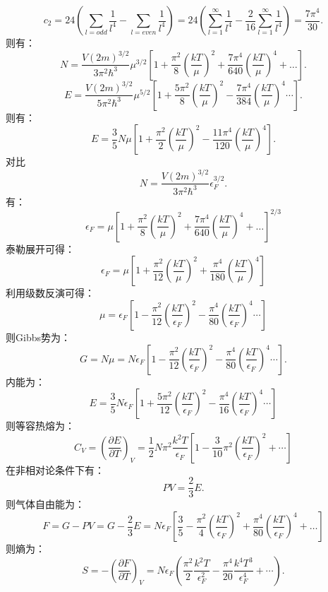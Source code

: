 \documentclass[reqno,a4paper,12pt]{amsart}
\begin{document}
\begin{tcolorbox}[breakable, colback = black!5!white, colframe = black]
\[\]
\[
	c_2 = 24 \left( \sum_{l=odd}\frac{1}{l^4} - \sum_{l=even} \frac{1}{l^4} \right) = 24 \left( \sum_{l=1}^{\infty} \frac{1}{l^4} - \frac{2}{16}\sum_{l=1}^{\infty} \frac{1}{l^4} \right) = \frac{7\pi^4}{30}.
\]
则有：
\[
	N = \frac{V(2m)^{3/2}}{3\pi^2\hbar^3} \mu^{3/2} \left[ 1 + \frac{\pi^2}{8}\left( \frac{kT}{\mu} \right)^2 + \frac{7\pi^4}{640} \left( \frac{kT}{\mu} \right)^4 + \dots \right].
\]
\[
	E = \frac{V(2m)^{3/2}}{5\pi^2\hbar^3}\mu^{5/2}\left[ 1 + \frac{5\pi^2}{8}\left( \frac{kT}{\mu} \right)^2 - \frac{7\pi^4}{384}\left( \frac{kT}{\mu} \right)^4 \cdots \right].
\]
则有：
\[
	E = \frac{3}{5}N\mu \left[ 1 + \frac{\pi^2}{2}\left( \frac{kT}{\mu} \right)^2 - \frac{11\pi^4}{120}\left( \frac{kT}{\mu} \right)^4 \right].
\]
对比
\[
	N = \frac{V(2m)^{3/2}}{3\pi^2\hbar^3}\epsilon_F^{3/2}.
\]
有：
\[
	\epsilon_F = \mu \left[ 1 + \frac{\pi^2}{8}\left( \frac{kT}{\mu} \right)^2 + \frac{7\pi^4}{640} \left( \frac{kT}{\mu} \right)^4 + \dots \right]^{2/3}
\]
泰勒展开可得：
\[
	\epsilon_F = \mu\left[ 1 + \frac{\pi^2}{12}\left( \frac{kT}{\mu} \right)^2 + \frac{\pi^4}{180}\left( \frac{kT}{\mu} \right)^4 \right]
\]
利用级数反演可得：
\[
	\mu = \epsilon_F \left[ 1 - \frac{\pi^2}{12}\left( \frac{kT}{\epsilon_F} \right)^2 - \frac{\pi^4}{80}\left( \frac{kT}{\epsilon_F} \right)^4 \cdots \right]
\]
则Gibbs势为：
\[
	G = N\mu = N\epsilon_F \left[ 1 - \frac{\pi^2}{12}\left( \frac{kT}{\epsilon_F} \right)^2 - \frac{\pi^4}{80}\left( \frac{kT}{\epsilon_F} \right)^4 \cdots  \right].
\]
内能为：
\[
	E = \frac{3}{5}N\epsilon_F \left[ 1 + \frac{5\pi^2}{12}\left( \frac{kT}{\epsilon_F} \right)^2 - \frac{\pi^4}{16}\left( \frac{kT}{\epsilon_F} \right)^4 \cdots \right]
\]
则等容热熔为：
\[
	C_V = \left( \frac{\partial E}{\partial T} \right)_V = \frac{1}{2}N\pi^2\frac{k^2T}{\epsilon_F} \left[ 1 - \frac{3}{10}\pi^2\left( \frac{kT}{\epsilon_F} \right)^2 + \cdots \right]
\]
在非相对论条件下有：
\[
	PV = \frac{2}{3}E.
\]
则气体自由能为：
\[
	F = G - PV = G - \frac{2}{3}E = N\epsilon_F\left[ \frac{3}{5} - \frac{\pi^2}{4}\left( \frac{kT}{\epsilon_F} \right)^2 + \frac{\pi^4}{80}\left( \frac{kT}{\epsilon_F} \right)^4 + \dots \right]
\]
则熵为：
\[
	S = -\left( \frac{\partial F}{\partial T} \right)_V = N\epsilon_F\left( \frac{\pi^2}{2}\frac{k^2T}{\epsilon_F^2} - \frac{\pi^4}{20}\frac{k^4T^3}{\epsilon_F^4} + \cdots \right).
\]

\end{tcolorbox}
\end{document}
